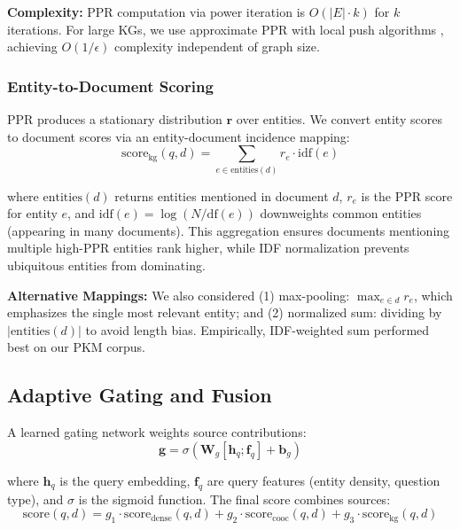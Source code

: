 \documentclass[11pt,a4paper]{article}
\begin{document}
\textbf{Complexity:} PPR computation via power iteration is $O(|E| \cdot k)$ for $k$ iterations. For large KGs, we use approximate PPR with local push algorithms \citep{andersen2006local}, achieving $O(1/\epsilon)$ complexity independent of graph size.

\subsubsection{Entity-to-Document Scoring}
\label{sec:entity_doc_mapping}

PPR produces a stationary distribution $\mathbf{r}$ over entities. We convert entity scores to document scores via an entity-document incidence mapping:
\begin{equation}
\text{score}_{\text{kg}}(q, d) = \sum_{e \in \text{entities}(d)} r_e \cdot \text{idf}(e)
\end{equation}

where $\text{entities}(d)$ returns entities mentioned in document $d$, $r_e$ is the PPR score for entity $e$, and $\text{idf}(e) = \log(N / \text{df}(e))$ downweights common entities (appearing in many documents). This aggregation ensures documents mentioning multiple high-PPR entities rank higher, while IDF normalization prevents ubiquitous entities from dominating.

\textbf{Alternative Mappings:} We also considered (1) max-pooling: $\max_{e \in d} r_e$, which emphasizes the single most relevant entity; and (2) normalized sum: dividing by $|\text{entities}(d)|$ to avoid length bias. Empirically, IDF-weighted sum performed best on our PKM corpus.

\subsection{Adaptive Gating and Fusion}
\label{sec:gating}

A learned gating network weights source contributions:
\begin{equation}
\mathbf{g} = \sigma(\mathbf{W}_g [\mathbf{h}_q; \mathbf{f}_q] + \mathbf{b}_g)
\end{equation}

where $\mathbf{h}_q$ is the query embedding, $\mathbf{f}_q$ are query features (entity density, question type), and $\sigma$ is the sigmoid function. The final score combines sources:
\begin{equation}
\text{score}(q, d) = g_1 \cdot \text{score}_{\text{dense}}(q, d) + g_2 \cdot \text{score}_{\text{cooc}}(q, d) + g_3 \cdot \text{score}_{\text{kg}}(q, d)
\end{equation}
\end{document}
